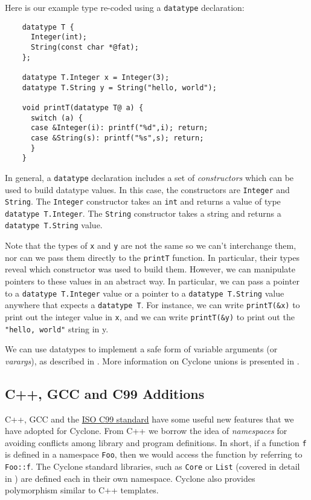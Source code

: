 Here is our example type re-coded using a \texttt{datatype} declaration:
\begin{verbatim}
    datatype T {
      Integer(int);
      String(const char *@fat);
    };

    datatype T.Integer x = Integer(3);
    datatype T.String y = String("hello, world");

    void printT(datatype T@ a) {
      switch (a) {
      case &Integer(i): printf("%d",i); return;
      case &String(s): printf("%s",s); return;
      }
    }
\end{verbatim}
In general, a \texttt{datatype} declaration includes a set of
\emph{constructors} which can be used to build datatype values.
In this case, the constructors are \texttt{Integer} and \texttt{String}.
The \texttt{Integer} constructor takes an \texttt{int} and returns
a value of type \texttt{datatype T.Integer}.  The \texttt{String}
constructor takes a string and returns a \texttt{datatype T.String}
value.  

Note that the types of \texttt{x} and \texttt{y} are not 
the same so we can't interchange them, nor can we pass them
directly to the \texttt{printT} function.  In particular,
their types reveal which constructor was used to build
them.  However, we can manipulate pointers to these values
in an abstract way.  In particular, 
we can pass a pointer to a \texttt{datatype T.Integer} value
or a pointer to a \texttt{datatype T.String} value 
anywhere that expects a \texttt{datatype T}.  For instance,
we can write \texttt{printT(\&x)} to print out the integer 
value in \texttt{x}, and we can write \texttt{printT(\&y)}
to print out the \texttt{"hello, world"} string in y.

We can use datatypes to implement a safe form of variable arguments
(or \emph{varargs}), as described in
.  More information
on Cyclone unions is presented in
.

\subsection{C++, GCC and C99 Additions}

C++, GCC and the
\href{http://web.onetelnet.ch/~twolf/tw/c/c9x_changes.html}{ISO C99
  standard} have some useful new features that we have adopted for
Cyclone.  From C++ we borrow the idea of \emph{namespaces} for
avoiding conflicts among library and program definitions.  In short,
if a function \texttt{f} is defined in a namespace \texttt{Foo}, then
we would access the function by referring to \texttt{Foo::f}.  The
Cyclone standard libraries, such as \texttt{Core} or \texttt{List}
(covered in detail in ) are defined
each in their own namespace.  Cyclone also provides polymorphism
similar to C++ templates.

